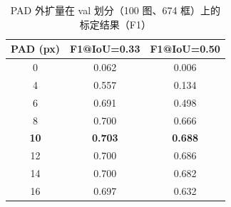 \begin{table}[t]
\centering
\caption{PAD 外扩量在 val 划分（100 图、674 框）上的标定结果（F1）}
\label{tab:pad_sweep}
\begin{tabular}{ccc}
\toprule
PAD (px) & F1@IoU=0.33 & F1@IoU=0.50 \\
\midrule
0 & 0.062 & 0.006 \\
4 & 0.557 & 0.134 \\
6 & 0.691 & 0.498 \\
8 & 0.700 & 0.666 \\
\textbf{10} & \textbf{0.703} & \textbf{0.688} \\
12 & 0.700 & 0.686 \\
14 & 0.700 & 0.682 \\
16 & 0.697 & 0.632 \\
\bottomrule
\end{tabular}
\end{table}
